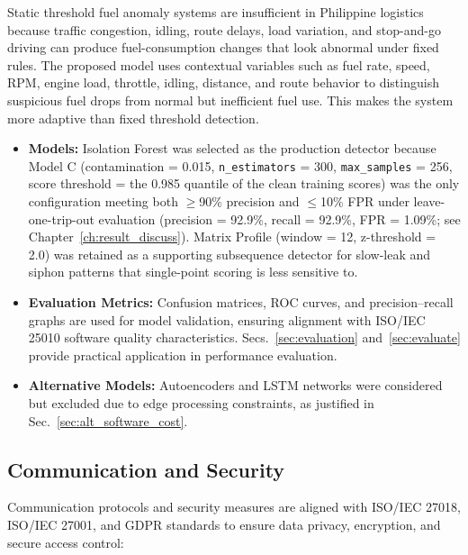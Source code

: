 Static threshold fuel anomaly systems are insufficient in Philippine logistics because traffic congestion, idling, route delays, load variation, and stop-and-go driving can produce fuel-consumption changes that look abnormal under fixed rules. The proposed model uses contextual variables such as fuel rate, speed, RPM, engine load, throttle, idling, distance, and route behavior to distinguish suspicious fuel drops from normal but inefficient fuel use. This makes the system more adaptive than fixed threshold detection.

\begin{itemize}  
    \item \textbf{Models:} Isolation Forest was selected as the production detector because Model C (contamination = 0.015, \texttt{n\_estimators} = 300, \texttt{max\_samples} = 256, score threshold = the 0.985 quantile of the clean training scores) was the only configuration meeting both $\geq$90\% precision and $\leq$10\% FPR under leave-one-trip-out evaluation (precision = 92.9\%, recall = 92.9\%, FPR = 1.09\%; see Chapter~\ref{ch:result_discuss}). Matrix Profile (window = 12, z-threshold = 2.0) was retained as a supporting subsequence detector for slow-leak and siphon patterns that single-point scoring is less sensitive to.

    \item \textbf{Evaluation Metrics:} Confusion matrices, ROC curves, and precision–recall graphs are used for model validation, ensuring alignment with ISO/IEC 25010 software quality characteristics. Secs.~\ref{sec:evaluation} and~\ref{sec:evaluate} provide practical application in performance evaluation.

    \item \textbf{Alternative Models:} Autoencoders and LSTM networks were considered but excluded due to edge processing constraints, as justified in Sec.~\ref{sec:alt_software_cost}.  
\end{itemize}  

\subsection{Communication and Security}  

Communication protocols and security measures are aligned with ISO/IEC 27018, ISO/IEC 27001, and GDPR standards to ensure data privacy, encryption, and secure access control:  

